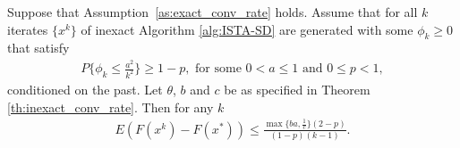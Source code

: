 \documentclass[11pt]{article}
\numberwithin{equation}{section}
\begin{document}
\begin{theorem}\label{th:inexact_random_conv_rate}
Suppose that Assumption~\ref{as:exact_conv_rate} holds. 
Assume that for all $k$ iterates $\{x^k\}$ of inexact Algorithm \ref{alg:ISTA-SD} are generated with some $\phi_k\geq 0$ that satisfy
\begin{align}
\label{equ:phi_conv_rate_required}
    P\{\phi_k \leq \frac{a^2}{k^2}\}\geq 1-p, \mbox{ for\ some\ } 0<a \leq 1 \mbox{ and }  0\leq p<1,
\end{align}
conditioned on the past. 
Let  $\theta$, $b$ and $c$ be as specified in Theorem \ref{th:inexact_conv_rate}. Then for any $k$
\begin{align}
    \label{eq:bound_F_F*}
	E(F(x^k) - F(x^*) )
    \leq \frac{\max\{ba, \frac{1}{c}\}(2-p)}{(1-p)(k-1)}. 
\end{align}
\end{theorem}
\end{document}
